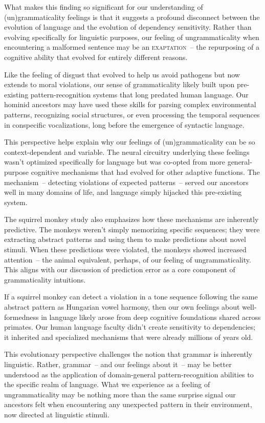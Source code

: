 What makes this finding so significant for our understanding of (un)gram\-maticality feelings is that it suggests a profound disconnect between the evolution of language and the evolution of dependency sensitivity. Rather than evolving specifically for linguistic purposes, our feeling of ungrammaticality when encountering a malformed sentence may be an \textsc{exaptation}~-- the repurposing of a cognitive ability that evolved for entirely different reasons.

Like the feeling of disgust that evolved to help us avoid pathogens but now extends to moral violations, our sense of grammaticality likely built upon pre-existing pattern-recognition systems that long predated human language. Our hominid ancestors may have used these skills for parsing complex environmental patterns, recognizing social structures, or even processing the temporal sequences in conspecific vocalizations, long before the emergence of syntactic language.

This perspective helps explain why our feelings of (un)grammaticality can be so context-dependent and variable. The neural circuitry underlying these feelings wasn't optimized specifically for language but was co-opted from more general-purpose cognitive mechanisms that had evolved for other adaptive functions. The mechanism~-- detecting violations of expected patterns~-- served our ancestors well in many domains of life, and language simply hijacked this pre-existing system.

The squirrel monkey study also emphasizes how these mechanisms are inherently predictive. The monkeys weren't simply memorizing specific sequences; they were extracting abstract patterns and using them to make predictions about novel stimuli. When these predictions were violated, the monkeys showed increased attention~-- the animal equivalent, perhaps, of our feeling of ungrammaticality. This aligns with our discussion of prediction error as a core component of grammaticality intuitions.

If a squirrel monkey can detect a violation in a tone sequence following the same abstract pattern as Hungarian vowel harmony, then our own feelings about well-formedness in language likely arose from deep cognitive foundations shared across primates. Our human language faculty didn't create sensitivity to dependencies; it inherited and specialized mechanisms that were already millions of years old.

This evolutionary perspective challenges the notion that grammar is inherently linguistic. Rather, grammar~-- and our feelings about it~-- may be better understood as the application of domain-general pattern-recognition abilities to the specific realm of language. What we experience as a feeling of ungrammaticality may be nothing more than the same surprise signal our ancestors felt when encountering any unexpected pattern in their environment, now directed at linguistic stimuli.

